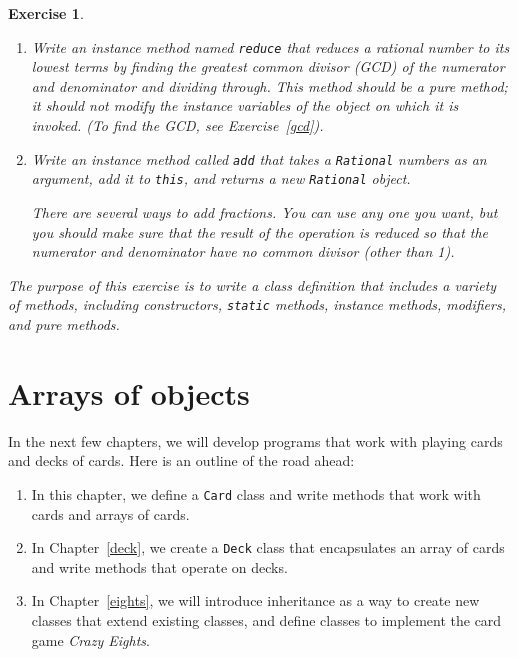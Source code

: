 \documentclass[12pt]{book}
\theoremstyle{exercise}
\newtheorem{exercise}{Exercise}[chapter]
\newcommand{\java}[1]{\verb"#1"}
\begin{document}
\begin{exercise}
\begin{enumerate}
\item Write an instance method named \java{reduce} that reduces a rational number to its lowest terms by finding the greatest common divisor (GCD) of the numerator and denominator and dividing through.
This method should be a pure method; it should not modify the instance variables of the object on which it is invoked.
(To find the GCD, see Exercise~\ref{gcd}).

\item Write an instance method called \java{add} that takes a \java{Rational} numbers as an argument, add it to \java{this}, and returns a new \java{Rational} object.

There are several ways to add fractions.
You can use any one you want, but you should make sure that the result of the operation is reduced so that the numerator and denominator have no common divisor (other than 1).
\end{enumerate}

The purpose of this exercise is to write a class definition that includes a variety of methods, including constructors, \java{static} methods, instance methods, modifiers, and pure methods.
\end{exercise}


\chapter{Arrays of objects}

In the next few chapters, we will develop programs that work with playing cards and decks of cards.
Here is an outline of the road ahead:

\begin{enumerate}

\item In this chapter, we define a \java{Card} class and write methods that work with cards and arrays of cards.

\item In Chapter~\ref{deck}, we create a \java{Deck} class that encapsulates an array of cards and write methods that operate on decks.

\item In Chapter~\ref{eights}, we will introduce inheritance as a way to create new classes that extend existing classes, and define classes to implement the card game {\em Crazy Eights}.

\end{enumerate}

\end{document}
